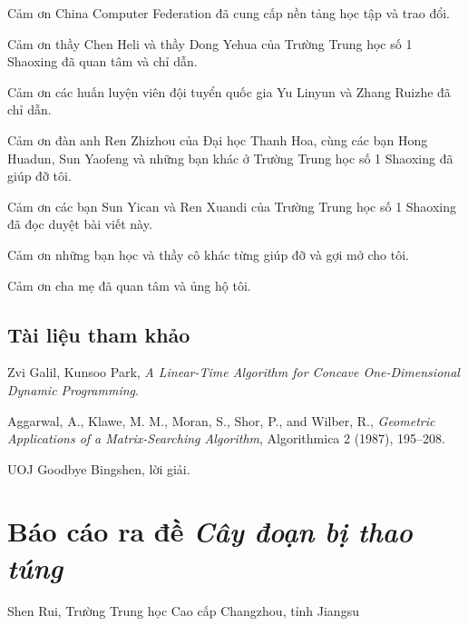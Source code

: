 \documentclass[11pt]{article}
\begin{document}
Cảm ơn China Computer Federation đã cung cấp nền tảng học tập và trao đổi.

Cảm ơn thầy Chen Heli và thầy Dong Yehua của Trường Trung học số 1 Shaoxing đã
quan tâm và chỉ dẫn.

Cảm ơn các huấn luyện viên đội tuyển quốc gia Yu Linyun và Zhang Ruizhe đã chỉ
dẫn.

Cảm ơn đàn anh Ren Zhizhou của Đại học Thanh Hoa, cùng các bạn Hong Huadun,
Sun Yaofeng và những bạn khác ở Trường Trung học số 1 Shaoxing đã giúp đỡ tôi.

Cảm ơn các bạn Sun Yican và Ren Xuandi của Trường Trung học số 1 Shaoxing đã
đọc duyệt bài viết này.

Cảm ơn những bạn học và thầy cô khác từng giúp đỡ và gợi mở cho tôi.

Cảm ơn cha mẹ đã quan tâm và ủng hộ tôi.

\subsection*{Tài liệu tham khảo}

\begin{enumerate}[label={[\arabic*]}]
  \item Zvi Galil, Kunsoo Park, \emph{A Linear-Time Algorithm for Concave
  One-Dimensional Dynamic Programming}.

  \item Aggarwal, A., Klawe, M. M., Moran, S., Shor, P., and Wilber, R.,
  \emph{Geometric Applications of a Matrix-Searching Algorithm},
  Algorithmica 2 (1987), 195--208.

  \item UOJ Goodbye Bingshen, lời giải.
\end{enumerate}

\section{Báo cáo ra đề \texorpdfstring{\emph{Cây đoạn bị thao túng}}{Cây đoạn bị thao túng}}

\begin{center}
Shen Rui, Trường Trung học Cao cấp Changzhou, tỉnh Jiangsu
\end{center}

\renewcommand{\abstractname}{Tóm tắt}
\begin{abstract}
Đây là một bài cấu trúc dữ liệu nhiều lời giải, lấy cây đoạn làm bối cảnh,
do tác giả ra trong vòng bốn của đợt thi thử đội tuyển quốc gia năm 2017.
Bài viết ghi lại ba khung tư duy khác nhau để giải bài toán này. Mỗi hướng
đều đòi hỏi thí sinh có năng lực trừu tượng hóa nhất định để dựng mô hình,
đồng thời phải vận dụng linh hoạt tham lam, nhảy bội, phân trị cùng các cấu
trúc dữ liệu như cây đoạn, cây lồng cây và cây động để duy trì thuận tiện
thông tin trong mô hình rồi giải bài toán.
\end{abstract}
\end{document}
